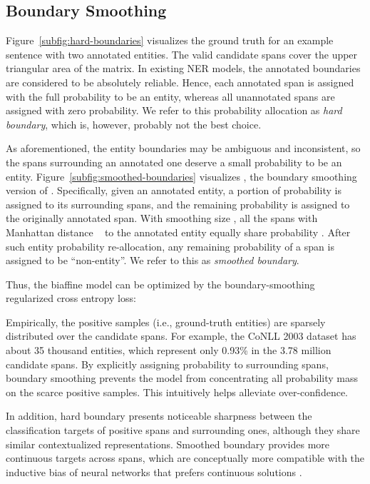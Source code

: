 \documentclass[11pt]{article}
\begin{document}
\subsection{Boundary Smoothing} 
Figure~\ref{subfig:hard-boundaries} visualizes the ground truth  for an example sentence with two annotated entities. The valid candidate spans cover the upper triangular area of the matrix. In existing NER models, the annotated boundaries are considered to be absolutely reliable. Hence, each annotated span is assigned with the full probability to be an entity, whereas all unannotated spans are assigned with zero probability. We refer to this probability allocation as \emph{hard boundary}, which is, however, probably not the best choice. 

As aforementioned, the entity boundaries may be ambiguous and inconsistent, so the spans surrounding an annotated one deserve a small probability to be an entity. Figure~\ref{subfig:smoothed-boundaries} visualizes , the boundary smoothing version of . Specifically, given an annotated entity, a portion of probability  is assigned to its surrounding spans, and the remaining probability  is assigned to the originally annotated span. With smoothing size , all the spans with Manhattan distance ~ to the annotated entity equally share probability . After such entity probability re-allocation, any remaining probability of a span is assigned to be ``non-entity''. We refer to this as \emph{smoothed boundary}. 


Thus, the biaffine model can be optimized by the boundary-smoothing regularized cross entropy loss: 


Empirically, the positive samples (i.e., ground-truth entities) are sparsely distributed over the candidate spans. For example, the CoNLL 2003 dataset has about 35 thousand entities, which represent only 0.93\% in the 3.78 million candidate spans. By explicitly assigning probability to surrounding spans, boundary smoothing prevents the model from concentrating all probability mass on the scarce positive samples. This intuitively helps alleviate over-confidence. 

In addition, hard boundary presents noticeable sharpness between the classification targets of positive spans and surrounding ones, although they share similar contextualized representations. Smoothed boundary provides more continuous targets across spans, which are conceptually more compatible with the inductive bias of neural networks that prefers continuous solutions \citep{hornik1989multilayer}. 
\end{document}
